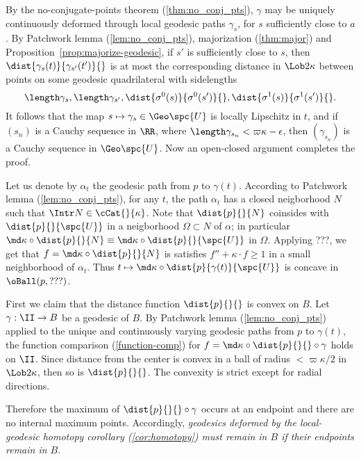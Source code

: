 By the no-conjugate-points theorem (\ref{thm:no_conj_pts}), $\gamma$ may be uniquely continuously deformed through local geodesic paths $\gamma_s$, for $s$ sufficiently close to $a$. 
By Patchwork lemma (\ref{lem:no_conj_pts}), majorization (\ref{thm:major}) and Proposition~\ref{prop:majorize-geodesic}, if $s'$ is sufficiently close to $s$, then $\dist{\gamma_s(t)}{\gamma_{s'}(t')}{}$ is at most the corresponding distance in $\Lob2{\kappa}$ between points on some geodesic quadrilateral with sidelengths 
$$\length\gamma_s, \length\gamma_{s'}, \dist{\sigma^0(s)}{\sigma^0(s')}{}, \dist{\sigma^1(s)}{\sigma^1(s')}{}.$$  
It follows that the map $s\mapsto\gamma_s\in\Geo \spc{U}$ is locally Lipschitz in $t$, and if $(s_n)$ is a  Cauchy sequence in $\RR$, where $\length\gamma_{s_n}< \varpi\kappa-\epsilon$, then $(\gamma_{s_n})$ is a Cauchy sequence in $\Geo \spc{U}$. Now  an open-closed argument completes the proof. 
\qeds





Let us denote by $\alpha_t$ the geodesic path from $p$ to $\gamma(t)$.
According to Patchwork lemma (\ref{lem:no_conj_pts}), for any $t$, the path $\alpha_t$ has a closed neigborhood $N$ such that $\Intr N\in \cCat{}{\kappa}$.
Note that $\dist{p}{}{N}$ coinsides with $\dist{p}{}{\spc{U}}$ in a neigborhood $\Omega\subset N$ of $\alpha$;
in particular $\md\kappa\circ\dist{p}{}{N}\equiv \md\kappa\circ\dist{p}{}{\spc{U}}$ in $\Omega$.
Applying ???, we get that $f=\md\kappa\circ\dist{p}{}{N}$ is satisfies $f''+\kappa\cdot f\ge 1$ in a small neighborhood of $\alpha_t$.
Thus $t\mapsto\md\kappa\circ\dist{p}{\gamma(t)}{\spc{U}}$ is concave in $\oBall(p,???)$.




First we claim that the distance function $\dist{p}{}{}$ is convex on $B$. 
Let $\gamma:\II\to B $ be a geodesic of $B$.  
By Patchwork lemma  (\ref{lem:no_conj_pts}) applied to the unique and continuously varying geodesic paths from $p$ to $\gamma(t)$, 
the function comparison (\ref{function-comp}) for $f=\md\kappa\circ \dist{p}{}{}\circ \gamma$ holds on $\II$. Since distance from the center is convex in a ball of radius $<\varpi\kappa/2$ in $\Lob2\kappa$, then so is $\dist{p}{}{}$.  The convexity is strict except for radial directions.  

Therefore the maximum of $\dist{p}{}{}\circ \gamma$ occurs at an endpoint and there are no internal maximum points. Accordingly, \emph{geodesics deformed by the local-geodesic homotopy corollary (\ref{cor:homotopy}) 
must remain in $B$ if their endpoints remain in  $B$}.


